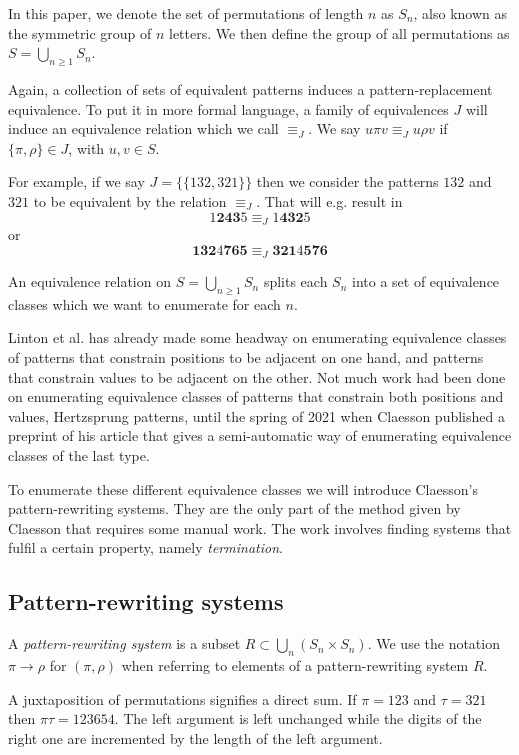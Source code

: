 \documentclass[a4paper, 11pt, english]{article}
\newcommand{\patternrule}{ \to \!}
\theoremstyle{definition}
\newcommand{\Sym}{S}
\begin{document}
In this paper, we denote the set of permutations of length $n$ as $\Sym_n$, also known as the
symmetric group of $n$ letters. We then define the group of all permutations as $\Sym =
\bigcup_{n \geq 1} \Sym_n$.

Again, a collection of sets of equivalent patterns induces a pattern-replacement equivalence.
To put it in more formal language, a family of equivalences $J$ will induce an equivalence relation
which we call $\equiv_J$. We say $u \pi v \equiv_J u \rho v$ if $\{ \pi, \rho \} \in J$, with $u,v
\in \Sym$.

For example, if we say $J = \{ \{ 132, 321 \} \}$ then we consider the patterns $132$ and $321$ to
be equivalent by the relation $\equiv_J$. That will e.g. result in
\[
    1\bm{243}5 \equiv_J 1\bm{432}5
\]
or
\[
  \bm{132}4\bm{765} \equiv_J \bm{321}4\bm{576}
\]

An equivalence relation on $\Sym = \bigcup_{n \geq 1} \Sym_n$ splits each $\Sym_n$
into a set of equivalence classes which we want to enumerate for each $n$. 

Linton et al. has already made some headway on enumerating equivalence classes of patterns that constrain
positions to be adjacent on one hand, and patterns that constrain values to be adjacent on the other.
Not much work had been done on enumerating equivalence classes of patterns that constrain both
positions and values, Hertzsprung patterns, until the spring of 2021 when Claesson published a
preprint of his article \cite{claesson:2021} that gives a semi-automatic way of enumerating equivalence classes of the
last type.

To enumerate these different equivalence classes we will introduce Claesson's 
pattern-rewriting systems. They are the only part of the method given by Claesson that requires
some manual work. The work involves finding systems that fulfil a certain property, namely
\emph{termination}.

\subsection{Pattern-rewriting systems}
A \emph{pattern-rewriting system} is a subset $R \subset \bigcup_{n} (\Sym_n \times \Sym_n)$.
We use the notation $\pi \patternrule \rho$ for $(\pi, \rho)$ when referring
to elements of a pattern-rewriting system $R$.

A juxtaposition of permutations signifies a direct sum. If $\pi=123$ and
$\tau=321$ then $\pi\tau=123654$. The left argument is left unchanged while the
digits of the right one are incremented by the length of the left argument.
\end{document}
